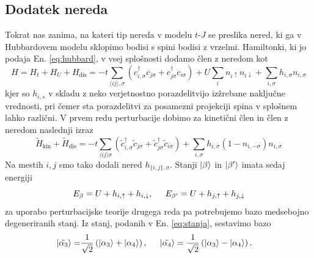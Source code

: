 \begin{appendices}
\section{Dodatek nereda}
Tokrat nas zanima, na kateri tip nereda v modelu $t$-$J$ se preslika nered, ki ga v Hubbardovem modelu sklopimo bodisi s spini bodisi z vrzelmi. Hamiltonki, ki jo podaja En. \eqref{eq:hubbard}, v vsej splošnosti dodamo člen z neredom kot 
\begin{equation}
H=H_t + H_U + H_\mathrm{dis}=-t\sum\limits_{\langle ij \rangle, \sigma}\left(c^\dagger_{i,\sigma} c_{j\sigma} + c^\dagger_{j\sigma}c_{i\sigma}\right) + U\sum_i n_{i\uparrow}n_{i\downarrow} + \sum\limits_{i,\sigma} h_{i,\sigma} n_{i, \sigma}  
\end{equation}
kjer so $h_{i,s}$ v skladu z neko verjetnostno porazdelitvijo izžrebane naključne vrednosti, pri čemer sta porazdelitvi za posamezni projekciji spina v splošnem lahko različni. V prvem redu perturbacije dobimo za kinetični člen in člen z neredom naslednji izraz
\begin{equation}
\tilde{H}_\mathrm{kin} + \tilde{H}_\mathrm{dis} = -t\sum\limits_{\langle ij \rangle \sigma} \left(\tilde{c}^\dagger_{i,\sigma} \tilde{c}_{j\sigma} + \tilde{c}^\dagger_{j\sigma}\tilde{c}_{i\sigma}\right) +\sum\limits_{i,\sigma} h_{i,\sigma} \left(1-n_{i,-\sigma}\right)n_{i,\sigma}
\end{equation}
Na mestih $i, j$ smo tako dodali nered $h_{\{i,j\},\sigma}$. Stanji $\vert\beta\rangle$ in $\vert\beta'\rangle$ imata sedaj energiji 
\begin{equation}
E_\beta = U + h_{i,\uparrow} + h_{i,\downarrow}, \hspace{5mm} E_{\beta'}= U + h_{j, \uparrow} + h_{j,\downarrow} 
\end{equation}
za uporabo perturbacijske teorije drugega reda pa potrebujemo bazo medsebojno degeneriranih stanj. Iz stanj, podanih v En. \eqref{eq:stanja}, sestavimo bazo 
\begin{equation}
\begin{split}
\ket{\tilde{\alpha_3}}=&\frac{1}{\sqrt{2}}\left( \ket{\alpha_3} + \ket{\alpha_4}\right), \hspace{ 5mm}\ket{\tilde{\alpha_4}}=\frac{1}{\sqrt{2}}\left(\ket{\alpha_3} - \ket{\alpha_4}\right).
\end{split}

\end{equation}
\end{appendices}
